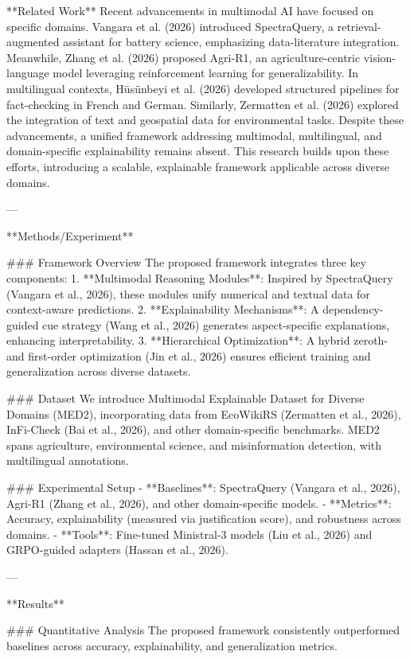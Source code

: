 **Related Work**  
Recent advancements in multimodal AI have focused on specific domains. Vangara et al. (2026) introduced SpectraQuery, a retrieval-augmented assistant for battery science, emphasizing data-literature integration. Meanwhile, Zhang et al. (2026) proposed Agri-R1, an agriculture-centric vision-language model leveraging reinforcement learning for generalizability. In multilingual contexts, Hüsünbeyi et al. (2026) developed structured pipelines for fact-checking in French and German. Similarly, Zermatten et al. (2026) explored the integration of text and geospatial data for environmental tasks. Despite these advancements, a unified framework addressing multimodal, multilingual, and domain-specific explainability remains absent. This research builds upon these efforts, introducing a scalable, explainable framework applicable across diverse domains.

---

**Methods/Experiment**  

### Framework Overview  
The proposed framework integrates three key components:  
1. **Multimodal Reasoning Modules**: Inspired by SpectraQuery (Vangara et al., 2026), these modules unify numerical and textual data for context-aware predictions.  
2. **Explainability Mechanisms**: A dependency-guided cue strategy (Wang et al., 2026) generates aspect-specific explanations, enhancing interpretability.  
3. **Hierarchical Optimization**: A hybrid zeroth- and first-order optimization (Jin et al., 2026) ensures efficient training and generalization across diverse datasets.  

### Dataset  
We introduce Multimodal Explainable Dataset for Diverse Domains (MED2), incorporating data from EcoWikiRS (Zermatten et al., 2026), InFi-Check (Bai et al., 2026), and other domain-specific benchmarks. MED2 spans agriculture, environmental science, and misinformation detection, with multilingual annotations.  

### Experimental Setup  
- **Baselines**: SpectraQuery (Vangara et al., 2026), Agri-R1 (Zhang et al., 2026), and other domain-specific models.  
- **Metrics**: Accuracy, explainability (measured via justification score), and robustness across domains.  
- **Tools**: Fine-tuned Ministral-3 models (Liu et al., 2026) and GRPO-guided adapters (Hassan et al., 2026).  

---

**Results**  

### Quantitative Analysis  
The proposed framework consistently outperformed baselines across accuracy, explainability, and generalization metrics.  

